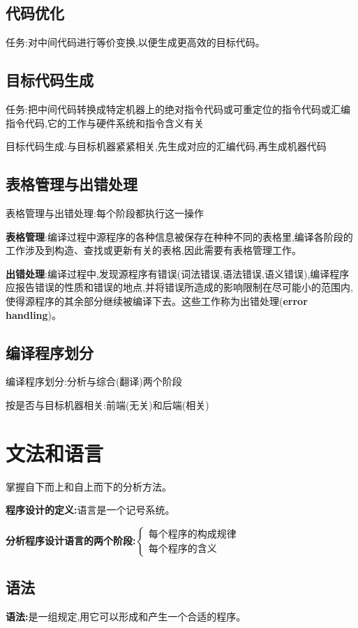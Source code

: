 \subsection{代码优化}
任务:对中间代码进行等价变换,以便生成更高效的目标代码。

\subsection{目标代码生成}
任务:把中间代码转换成特定机器上的绝对指令代码或可重定位的指令代码或汇编指令代码,它的工作与硬件系统和指令含义有关

目标代码生成:与目标机器紧紧相关,先生成对应的汇编代码,再生成机器代码

\subsection{表格管理与出错处理}
表格管理与出错处理:每个阶段都执行这一操作

\textbf{表格管理}:编译过程中源程序的各种信息被保存在种种不同的表格里,编译各阶段的工作涉及到构造、查找或更新有关的表格,因此需要有表格管理工作。

\textbf{出错处理}:编译过程中,发现源程序有错误(词法错误,语法错误,语义错误),编译程序应报告错误的性质和错误的地点,并将错误所造成的影响限制在尽可能小的范围内,使得源程序的其余部分继续被编译下去。这些工作称为出错处理(\textbf{error handling})。

\subsection{编译程序划分}
编译程序划分:分析与综合(翻译)两个阶段

按是否与目标机器相关:前端(无关)和后端(相关)

\section{文法和语言}

掌握自下而上和自上而下的分析方法。

\spaceline
\textbf{程序设计的定义:}语言是一个记号系统。

\textbf{分析程序设计语言的两个阶段:}$\left \{\begin{array}{l} \text{每个程序的构成规律}\\\text{每个程序的含义}\end{array} \right .$

\subsection{语法}
\textbf{语法:}是一组规定,用它可以形成和产生一个合适的程序。

